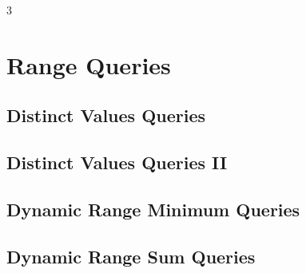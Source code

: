 \documentclass[8pt]{extarticle}
\begin{document}
\pagebreak
\begin{multicols*}{3}

\section{Range Queries}

\subsection{Distinct Values Queries}
\begin{caixaenunciado}

\end{caixaenunciado}
\vspace{0.3cm}


\subsection{Distinct Values Queries II}
\begin{caixaenunciado}

\end{caixaenunciado}
\vspace{0.3cm}


\subsection{Dynamic Range Minimum Queries}
\begin{caixaenunciado}

\end{caixaenunciado}
\vspace{0.3cm}


\subsection{Dynamic Range Sum Queries}
\begin{caixaenunciado}

\end{caixaenunciado}
\vspace{0.3cm}



\end{multicols*}
\end{document}

